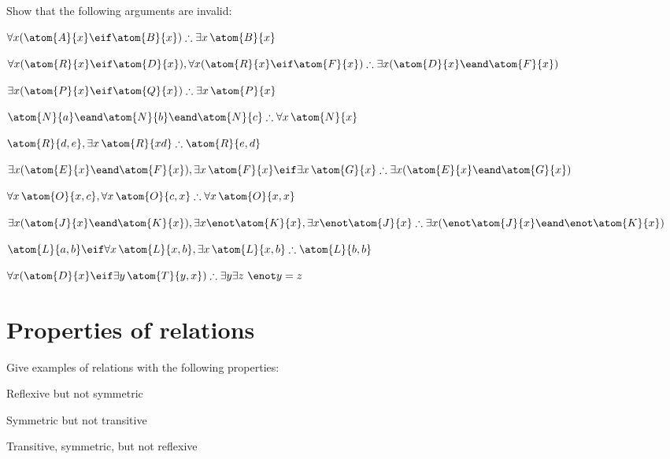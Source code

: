 \problempart
Show that the following arguments are invalid:
\begin{compactlist}
\item $\forall x(\atom{A}{x} \eif \atom{B}{x}) \therefore \exists x\,\atom{B}{x}$
\item $\forall x(\atom{R}{x} \eif \atom{D}{x}), \forall x(\atom{R}{x} \eif \atom{F}{x}) \therefore \exists x(\atom{D}{x} \eand \atom{F}{x})$
\item $\exists x(\atom{P}{x}\eif \atom{Q}{x}) \therefore \exists x\,\atom{P}{x}$
\item $\atom{N}{a} \eand \atom{N}{b} \eand \atom{N}{c} \therefore \forall x\,\atom{N}{x}$
\item $\atom{R}{d,e}, \exists x\,\atom{R}{xd} \therefore \atom{R}{e,d}$
\item $\exists x(\atom{E}{x} \eand \atom{F}{x}), \exists x\,\atom{F}{x} \eif \exists x\,\atom{G}{x} \therefore \exists x(\atom{E}{x} \eand \atom{G}{x})$
\item $\forall x\,\atom{O}{x,c}, \forall x\,\atom{O}{c,x} \therefore \forall x\,\atom{O}{x,x}$
\item $\exists x(\atom{J}{x} \eand \atom{K}{x}), \exists x \enot \atom{K}{x}, \exists x \enot \atom{J}{x} \therefore \exists x(\enot \atom{J}{x} \eand \enot \atom{K}{x})$
\item $\atom{L}{a,b} \eif \forall x\,\atom{L}{x,b}, \exists x\,\atom{L}{x,b} \therefore \atom{L}{b,b}$
\item $\forall x(\atom{D}{x} \eif \exists y\,\atom{T}{y,x}) \therefore \exists y \exists z\ \enot y= z$
\end{compactlist}


\chapter{Properties of relations}
\setcounter{ProbPart}{0}

\solutions
\problempart
Give examples of relations with the following properties:
\begin{compactlist}
	\item Reflexive but not symmetric \hfill{}
	\item Symmetric but not transitive \hfill{}
	\item Transitive, symmetric, but not reflexive
	\hfill{}
\end{compactlist}


